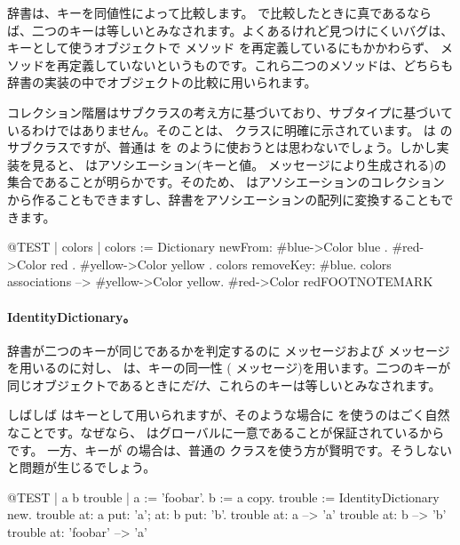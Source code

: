 \documentclass[a4paper,10pt,twoside]{book}
\begin{document}
辞書は、キーを同値性によって比較します。 \ct{=} で比較したときに真であるならば、二つのキーは等しいとみなされます。よくあるけれど見つけにくいバグは、キーとして使うオブジェクトで \ct{=}メソッド を再定義しているにもかかわらず、 メソッドを再定義していないというものです。これら二つのメソッドは、どちらも辞書の実装の中でオブジェクトの比較に用いられます。

コレクション階層はサブクラスの考え方に基づいており、サブタイプに基づいているわけではありません。そのことは、 クラスに明確に示されています。 は  のサブクラスですが、普通は  を  のように使おうとは思わないでしょう。しかし実装を見ると、 はアソシエーション(キーと値。 メッセージにより生成される)の集合であることが明らかです。そのため、 はアソシエーションのコレクションから作ることもできますし、辞書をアソシエーションの配列に変換することもできます。

\begin{code}{@TEST | colors |}
colors := Dictionary newFrom: { #blue->Color blue . #red->Color red . #yellow->Color yellow }.
colors removeKey: #blue.
colors associations --> {#yellow->Color yellow. #red->Color red}FOOTNOTEMARK
\end{code}

\paragraph{IdentityDictionary。}
辞書が二つのキーが同じであるかを判定するのに \ct{=} メッセージおよび  メッセージを用いるのに対し、 は、キーの同一性 ( メッセージ)を用います。\ie 二つのキーが同じオブジェクトであるときに\emph{だけ}、これらのキーは等しいとみなされます。

しばしば  はキーとして用いられますが、そのような場合に を使うのはごく自然なことです。なぜなら、 はグローバルに一意であることが保証されているからです。
一方、キーが  の場合は、普通の  クラスを使う方が賢明です。そうしないと問題が生じるでしょう。

\begin{code}{@TEST | a b trouble |}
a := 'foobar'.
b := a copy.
trouble := IdentityDictionary new.
trouble at: a put: 'a'; at: b put: 'b'.
trouble at: a          --> 'a'
trouble at: b          --> 'b'
trouble at: 'foobar' --> 'a'
\end{code}
\end{document}
